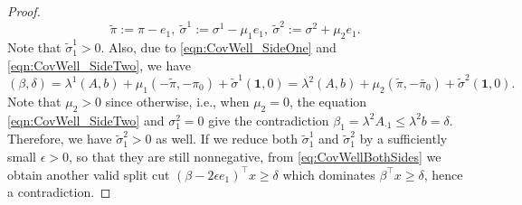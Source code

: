 \documentclass[11pt]{article}
\newcommand{\ones}{\boldsymbol{1}}
\newcommand{\bpar}{\beta}
\begin{document}
\begin{proof}
$$\tilde{\pi} := \pi - e_1, \ \tilde{\sigma}^1 := \sigma^1 - \mu_1 e_1, \ \tilde{\sigma}^2 := \sigma^2 + \mu_2 e_1.$$
Note that $\tilde{\sigma}^1_1 > 0$. Also, due to \eqref{eqn:CovWell_SideOne} and \eqref{eqn:CovWell_SideTwo}, we have
\begin{equation} 
\label{eq:CovWellBothSides}
(\bpar,\delta) = \lambda^1 (A,b) + \mu_1 (-\tilde{\pi},-\pi_0) + \tilde{\sigma}^1 (\ones,0) = \lambda^2 (A,b) + \mu_2 (\tilde{\pi},-\bar{\pi}_0) + \tilde{\sigma}^2 (\ones,0). 
\end{equation}
Note that $\mu_2 > 0$ since otherwise, i.e., when $\mu_2 = 0$, the equation \eqref{eqn:CovWell_SideTwo} and $\sigma^2_1 = 0$ give the contradiction $\bpar_1 = \lambda^2 A_{\cdot 1} \leq \lambda^2 b = \delta$. Therefore, we have $\tilde{\sigma}^2_1 > 0$ as well. If we reduce both $\tilde{\sigma}^1_1$ and $\tilde{\sigma}^2_1$ by a sufficiently small $\epsilon > 0$, so that they are still nonnegative, from \eqref{eq:CovWellBothSides} we obtain another valid split cut $(\bpar - 2 \epsilon e_1)^\top x \geq \delta$ which dominates $\bpar^\top x \geq \delta$, hence a contradiction.
\end{proof}
\end{document}
